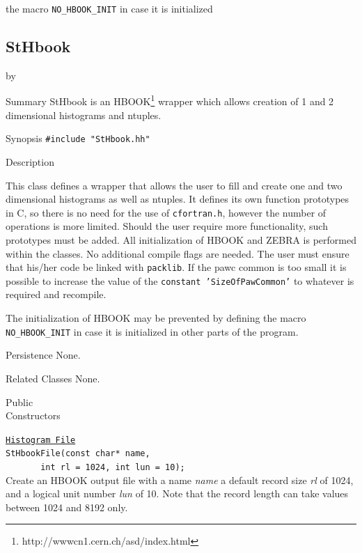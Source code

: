 \documentclass[twoside]{article}
\newcommand{\comp}[1]{\texttt{#1}}%
\newcommand{\entrylabel}[1]{\mbox{\textbf{{#1}}}\hfil}%
\newenvironment{entry}
{\begin{list}{}%
    {\renewcommand{\makelabel}{\entrylabel}%
     \setlength{\labelwidth}{90pt}%
     \setlength{\leftmargin}{\labelwidth}
     \advance\leftmargin by \labelsep%
      }%
    }%
  {\end{list}}
\newcommand{\Entrylabel}[1]%
{\raisebox{0pt}[1ex][0pt]{\makebox[\labelwidth][l]%
    {\parbox[t]{\labelwidth}{\hspace{0pt}\textbf{{#1}}}}}}
\newenvironment{Entry}%
{\renewcommand{\entrylabel}{\Entrylabel}\begin{entry}}%
  {\end{entry}}
\begin{document}
\begin{description}
%
  the macro \texttt{NO\_HBOOK\_INIT} in case it is initialized
%
\subsection{StHbook } \label{StHbook}
\begin{Entry}
\item[Summary]
    StHbook is an HBOOK\footnote{http://wwwcn1.cern.ch/asd/index.html}
    wrapper which allows creation of 1 and 2 dimensional histograms
    and ntuples.

\item[Synopsis]
    \verb+#include "StHbook.hh"+\\    
    
\item[Description]   
    
  This class defines a wrapper that allows the user to fill and
  create one and two dimensional histograms as well as ntuples.
  It defines its own function prototypes in C, so there is no
  need for the use of \texttt{cfortran.h}, however
  the number of operations is more limited.  Should the user require
  more functionality, such prototypes must be added.
  All initialization of HBOOK and ZEBRA is performed within the
  classes.  No additional compile flags are needed.  The user
  must ensure that his/her code be linked with \comp{packlib}.
  If the \/pawc\/ common is too small it is possible to increase
  the value of the  \texttt{constant 'SizeOfPawCommon'} to whatever
  is required and recompile.

  The initialization of HBOOK may be prevented by defining
  the macro \texttt{NO\_\-HBOOK\-\_INIT} in case it is initialized
  in other parts of the program.

\item[Persistence]
  None.

\item[Related Classes]
  None.
  
\item[Public\\ Constructors]

  \comp{\underline{Histogram File}} \\
  \verb+StHbookFile(const char* name,+\\
  \verb+       int rl = 1024, int lun = 10);+\\
  Create an HBOOK output file with a name {\em name} a default
  record size {\em rl} of 1024, and a logical unit number {\em lun} of 10.
  Note that the record length can take values between 1024 and 8192 only.
  

\end{Entry}
\end{description}
\end{document}
